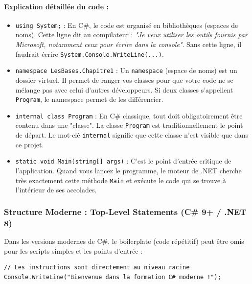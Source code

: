 \paragraph{Explication détaillée du code :}
\begin{itemize}
    \item \texttt{using System;} : En C\#, le code est organisé en bibliothèques (espaces de noms). Cette ligne dit au compilateur : \emph{"Je veux utiliser les outils fournis par Microsoft, notamment ceux pour écrire dans la console"}. Sans cette ligne, il faudrait écrire \texttt{System.Console.WriteLine(...)}.
    \item \texttt{namespace LesBases.Chapitre1} : Un \texttt{namespace} (espace de noms) est un dossier virtuel. Il permet de ranger vos classes pour que votre code ne se mélange pas avec celui d'autres développeurs. Si deux classes s'appellent \texttt{Program}, le namespace permet de les différencier.
    \item \texttt{internal class Program} : En C\# classique, tout doit obligatoirement être contenu dans une "classe". La classe \texttt{Program} est traditionnellement le point de départ. Le mot-clé \texttt{internal} signifie que cette classe n'est visible que dans ce projet.
    \item \texttt{static void Main(string[] args)} : C'est le point d'entrée critique de l'application. Quand vous lancez le programme, le moteur de .NET cherche très exactement cette méthode \texttt{Main} et exécute le code qui se trouve à l'intérieur de ses accolades.
\end{itemize}

\subsubsection{Structure Moderne : Top-Level Statements (C\# 9+ / .NET 8)}

Dans les versions modernes de C\#, le boilerplate (code répétitif) peut être omis pour les scripts simples et les points d'entrée :

\begin{lstlisting}[caption={Structure moderne avec Top-Level Statements}]
// Les instructions sont directement au niveau racine
Console.WriteLine("Bienvenue dans la formation C# moderne !");
\end{lstlisting}


